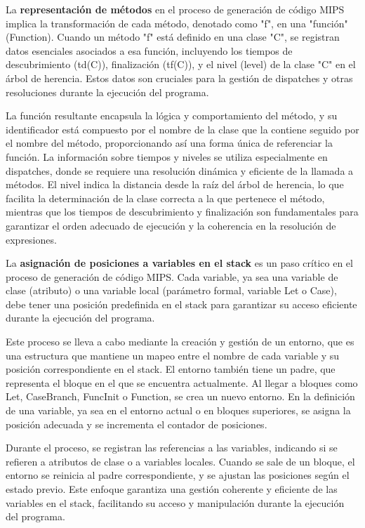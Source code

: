 \documentclass[10pt]{article} %
\begin{document}
	La \textbf{representación de métodos} en el proceso de generación de código MIPS implica la transformación de cada método, denotado como "f", en una "función" (Function). Cuando un método "f" está definido en una clase "C", se registran datos esenciales asociados a esa función, incluyendo los tiempos de descubrimiento (td(C)), finalización (tf(C)), y el nivel (level) de la clase "C" en el árbol de herencia. Estos datos son cruciales para la gestión de dispatches y otras resoluciones durante la ejecución del programa.
	
	La función resultante encapsula la lógica y comportamiento del método, y su identificador está compuesto por el nombre de la clase que la contiene seguido por el nombre del método, proporcionando así una forma única de referenciar la función. La información sobre tiempos y niveles se utiliza especialmente en dispatches, donde se requiere una resolución dinámica y eficiente de la llamada a métodos. El nivel indica la distancia desde la raíz del árbol de herencia, lo que facilita la determinación de la clase correcta a la que pertenece el método, mientras que los tiempos de descubrimiento y finalización son fundamentales para garantizar el orden adecuado de ejecución y la coherencia en la resolución de expresiones.
	
	La \textbf{asignación de posiciones a variables en el stack} es un paso crítico en el proceso de generación de código MIPS. Cada variable, ya sea una variable de clase (atributo) o una variable local (parámetro formal, variable Let o Case), debe tener una posición predefinida en el stack para garantizar su acceso eficiente durante la ejecución del programa.
	
	Este proceso se lleva a cabo mediante la creación y gestión de un entorno, que es una estructura que mantiene un mapeo entre el nombre de cada variable y su posición correspondiente en el stack. El entorno también tiene un padre, que representa el bloque en el que se encuentra actualmente. Al llegar a bloques como Let, CaseBranch, FuncInit o Function, se crea un nuevo entorno. En la definición de una variable, ya sea en el entorno actual o en bloques superiores, se asigna la posición adecuada y se incrementa el contador de posiciones.
	
	Durante el proceso, se registran las referencias a las variables, indicando si se refieren a atributos de clase o a variables locales. Cuando se sale de un bloque, el entorno se reinicia al padre correspondiente, y se ajustan las posiciones según el estado previo. Este enfoque garantiza una gestión coherente y eficiente de las variables en el stack, facilitando su acceso y manipulación durante la ejecución del programa.
	
\end{document}
